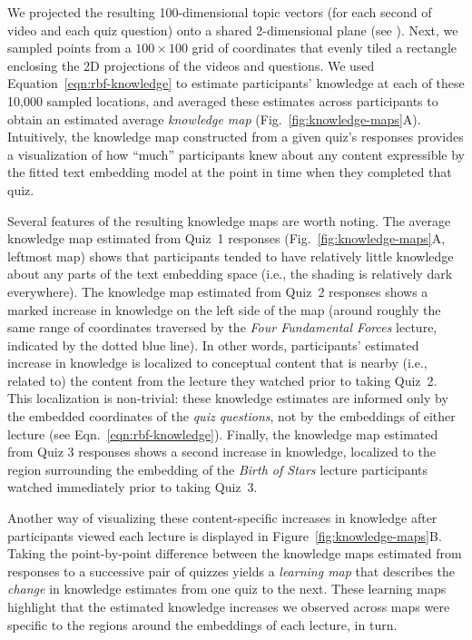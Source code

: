 \documentclass[10pt]{article}
\renewcommand{\nameref}[1]{\mbox{\textit{\oldnameref{#1}}}}
\begin{document}
We projected the resulting 100-dimensional topic vectors (for each second of
video and each quiz question) onto a shared 2-dimensional plane (see
\nameref{subsec:knowledge-maps}). Next, we sampled points from a $100 \times
100$ grid of coordinates that evenly tiled a rectangle enclosing the 2D
projections of the videos and questions. We used
Equation~\ref{eqn:rbf-knowledge} to estimate participants' knowledge at each of
these 10,000 sampled locations, and averaged these estimates across
participants to obtain an estimated average \textit{knowledge map}
(Fig.~\ref{fig:knowledge-maps}A). Intuitively, the knowledge map constructed
from a given quiz's responses provides a visualization of how ``much''
participants knew about any content expressible by the fitted text embedding
model at the point in time when they completed that quiz.

Several features of the resulting knowledge maps are worth noting. The average
knowledge map estimated from Quiz~1 responses (Fig.~\ref{fig:knowledge-maps}A,
leftmost map) shows that participants tended to have relatively little
knowledge about any parts of the text embedding space (i.e., the shading is
relatively dark everywhere). The knowledge map estimated from Quiz~2 responses
shows a marked increase in knowledge on the left side of the map (around
roughly the same range of coordinates traversed by the \textit{Four Fundamental
Forces} lecture, indicated by the dotted blue line). In other words,
participants' estimated increase in knowledge is localized to conceptual
content that is nearby (i.e., related to) the content from the lecture they
watched prior to taking Quiz~2. This localization is non-trivial: these
knowledge estimates are informed only by the embedded coordinates of the
\textit{quiz questions}, not by the embeddings of either lecture (see
Eqn.~\ref{eqn:rbf-knowledge}). Finally, the knowledge map estimated from Quiz 3
responses shows a second increase in knowledge, localized to the region
surrounding the embedding of the \textit{Birth of Stars} lecture participants
watched immediately prior to taking Quiz~3.

Another way of visualizing these content-specific increases in knowledge after
participants viewed each lecture is displayed in
Figure~\ref{fig:knowledge-maps}B. Taking the point-by-point difference between
the knowledge maps estimated from responses to a successive pair of quizzes
yields a \textit{learning map} that describes the \textit{change} in knowledge
estimates from one quiz to the next. These learning maps highlight that the
estimated knowledge increases we observed across maps were specific to the
regions around the embeddings of each lecture, in turn.
\end{document}
